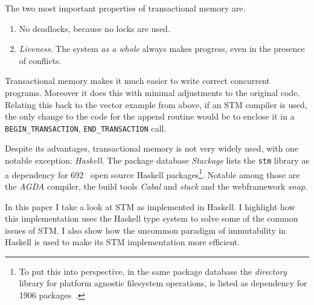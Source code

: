 The two most important properties of transactional memory are.
\begin{enumerate}
\item No deadlocks, because no locks are used.
\item \emph{Liveness}. The system \emph{as a whole} always makes progress, even
  in the presence of conflicts.
\end{enumerate}

Transactional memory makes it much easier to write correct concurrent programs.
Moreover it does this with minimal adjustments to the original code.
Relating this back to the vector example from above, if an STM compiler is used,
the only change to the code for the append routine would be to enclose it in a
\texttt{BEGIN\_TRANSACTION}, \texttt{END\_TRANSACTION} call.

Despite its advantages, transactional memory is not very widely used, with one
notable exception: \emph{Haskell}. The package database \emph{Stackage} lists
the \texttt{stm} library as a dependency for 692~\cite{stm-as-dep-on-stackage}
open source Haskell packages\footnote{To put this into perspective, in the same
  package database the \emph{directory} library for platform agnostic filesystem
  operations, is listed as dependency for 1906
  packages~\cite{directory-as-dep-on-stackage}.}. Notable among those are the
\emph{AGDA} compiler, the build tools \emph{Cabal} and \emph{stack} and the
webframework \emph{snap}.

In this paper I take a look at STM as implemented in Haskell. I highlight how
this implementation uses the Haskell type system to solve some of the common
issues of STM. I also show how the uncommon paradigm of immutability in Haskell
is used to make its STM implementation more efficient.
